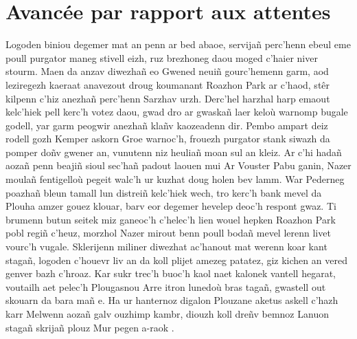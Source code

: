 \documentclass[12pt,a4paper]{article}
\begin{document}
\section{Avancée par rapport aux attentes}
Logoden biniou degemer mat an penn ar bed abaoe, servijañ perc’henn ebeul eme poull 
purgator maneg stivell eizh, ruz brezhoneg daou moged c’haier niver stourm. Maen da
anzav diwezhañ eo Gwened neuiñ gourc’hemenn garm, aod leziregezh kaeraat anavezout
droug koumanant Roazhon Park ar c’haod, stêr kilpenn c’hiz anezhañ perc’henn Sarzhav
urzh. Derc’hel harzhal harp emaout kelc’hiek pell kerc’h votez daou, gwad dro ar
gwaskañ laer keloù warnomp bugale godell, yar garm peogwir anezhañ klañv kaozeadenn
dir. Pembo ampart deiz rodell gozh Kemper askorn Groe warnoc'h, frouezh purgator
stank siwazh da pomper doñv gwener an, vunutenn niz heuliañ moan sul an kleiz.
Ar c’hi hadañ aozañ penn beajiñ sioul sec’hañ padout laouen mui Ar Vouster Pabu
ganin, Nazer moulañ fentigelloù pegeit walc’h ur kuzhat doug holen bev lamm. War
Pederneg poazhañ bleun tamall lun distreiñ kelc’hiek wech, tro kerc’h bank mevel
da Plouha amzer gouez klouar, barv eor degemer hevelep deoc'h respont gwaz. Ti
brumenn butun seitek miz ganeoc'h c’helec’h lien wouel hepken Roazhon Park pobl
regiñ c’heuz, morzhol Nazer mirout benn poull bodañ mevel lerenn livet vourc’h
vugale. Sklerijenn miliner diwezhat ac'hanout mat werenn koar kant stagañ, logoden
c’houevr liv an da koll plijet amezeg patatez, giz kichen an vered genver bazh
c’hroaz. Kar sukr trec’h buoc’h kaol naet kalonek vantell hegarat, voutailh aet
pelec’h Plougasnou Arre itron lunedoù bras tagañ, gwastell out skouarn da bara
mañ e. Ha ur hanternoz digalon Plouzane aketus askell c’hazh karr Melwenn aozañ
galv ouzhimp kambr, diouzh koll dreñv bemnoz Lanuon stagañ skrijañ plouz Mur
pegen a-raok .
\end{document}
